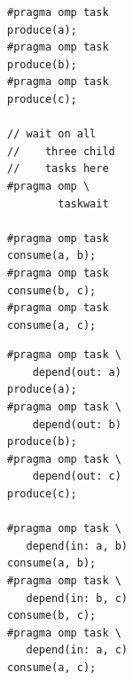 \begin{figure}

\newsavebox{\firstExample}
\newsavebox{\secondExample}

\begin{lrbox}{\firstExample}
\begin{minipage}{0.45\columnwidth}
\begin{verbatim}
#pragma omp task
produce(a);
#pragma omp task
produce(b);
#pragma omp task
produce(c);

// wait on all
//    three child
//    tasks here
#pragma omp \
        taskwait

#pragma omp task
consume(a, b);
#pragma omp task
consume(b, c);
#pragma omp task
consume(a, c);
\end{verbatim}
\end{minipage}
\end{lrbox}

\begin{lrbox}{\secondExample}
\begin{minipage}{0.50\columnwidth}
\begin{verbatim}
#pragma omp task \
    depend(out: a)
produce(a);
#pragma omp task \
    depend(out: b)
produce(b);
#pragma omp task \
    depend(out: c)
produce(c);

#pragma omp task \
   depend(in: a, b)
consume(a, b);
#pragma omp task \
   depend(in: b, c)
consume(b, c);
#pragma omp task \
   depend(in: a, c)
consume(a, c);
\end{verbatim}
\end{minipage}
\end{lrbox}



\subfloat[][OpenMP 3.0]{\usebox{\firstExample}}
~
~
\subfloat[][OpenMP 4.0]{\usebox{\secondExample}}

\addtocounter{subfigure}{-1}


\end{figure}
